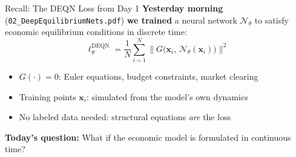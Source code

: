 \documentclass[aspectratio=169,11pt]{beamer}
\newcommand{\emphc}[1]{\textcolor{harvardcrimson}{#1}}
\newcommand{\x}{\bm{x}}
\begin{document}
\begin{frame}{Recall: The DEQN Loss from Day 1}
\textbf{Yesterday morning} (\texttt{02\_DeepEquilibriumNets.pdf}) \textbf{we trained} a neural network $\mathcal{N}_\theta$ to satisfy
economic equilibrium conditions in \emphc{discrete time}:
\[
\boxed{
\ell_\theta^{\text{DEQN}} = \frac{1}{N}\sum_{i=1}^{N}
\bigl\|G\bigl(\x_i,\,\mathcal{N}_\theta(\x_i)\bigr)\bigr\|^2
}
\]

\vspace{0.3em}
\begin{itemize}
    \item $G(\cdot) = 0$: Euler equations, budget constraints, market clearing
    \item Training points $\x_i$: simulated from the model's own dynamics
    \item \emphc{No labeled data needed}: structural equations \emph{are} the loss
\end{itemize}

\vspace{0.5em}
\textbf{Today's question:}
What if the economic model is formulated in \emphc{continuous time}?
\end{frame}
\end{document}
